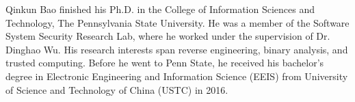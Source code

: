 
Qinkun Bao finished his Ph.D. in the College of Information Sciences
and Technology, The Pennsylvania State University. He was a member of the Software 
System Security Research Lab, where he worked under the supervision of Dr. Dinghao Wu.
His research interests span reverse engineering, binary analysis, and trusted computing. Before he went to Penn State, he received his bachelor's degree in Electronic Engineering and Information Science (EEIS) from University of Science and Technology of China (USTC) in 2016.


 